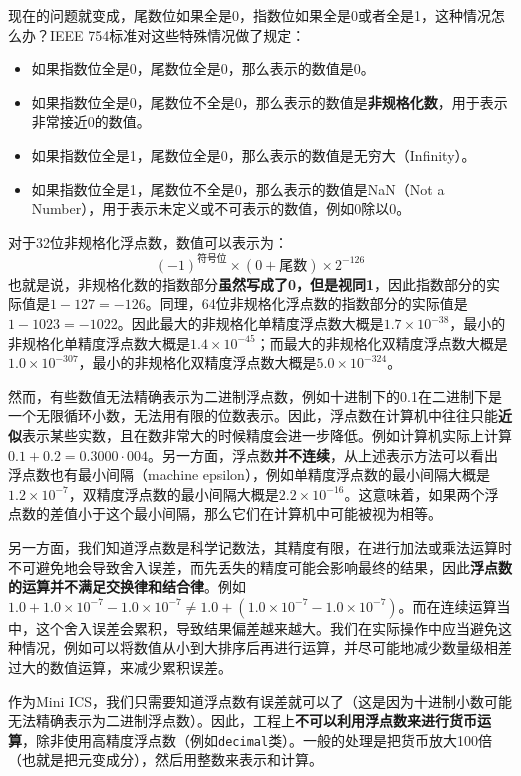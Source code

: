\documentclass[../main.tex]{subfiles}
\begin{document}
现在的问题就变成，尾数位如果全是0，指数位如果全是0或者全是1，这种情况怎么办？IEEE 754标准对这些特殊情况做了规定：
\begin{itemize}
  \item 如果指数位全是0，尾数位全是0，那么表示的数值是0。
  \item 如果指数位全是0，尾数位不全是0，那么表示的数值是\textbf{非规格化数}，用于表示非常接近0的数值。
  \item 如果指数位全是1，尾数位全是0，那么表示的数值是无穷大（Infinity）。
  \item 如果指数位全是1，尾数位不全是0，那么表示的数值是NaN（Not a Number），用于表示未定义或不可表示的数值，例如0除以0。
\end{itemize}
对于32位非规格化浮点数，数值可以表示为：
$$(-1)^{\text{符号位}} \times (0 + \text{尾数}) \times 2^{-126}$$
也就是说，非规格化数的指数部分\textbf{虽然写成了0，但是视同1}，因此指数部分的实际值是$1-127=-126$。同理，64位非规格化浮点数的指数部分的实际值是$1-1023=-1022$。因此最大的非规格化单精度浮点数大概是$1.7 \times 10^{-38}$，最小的非规格化单精度浮点数大概是$1.4 \times 10^{-45}$；而最大的非规格化双精度浮点数大概是$1.0 \times 10^{-307}$，最小的非规格化双精度浮点数大概是$5.0 \times 10^{-324}$。

然而，有些数值无法精确表示为二进制浮点数，例如十进制下的0.1在二进制下是一个无限循环小数，无法用有限的位数表示。因此，浮点数在计算机中往往只能\textbf{近似}表示某些实数，且在数非常大的时候精度会进一步降低。例如计算机实际上计算$0.1+0.2=0.3000\cdot004$。另一方面，浮点数\textbf{并不连续}，从上述表示方法可以看出浮点数也有最小间隔（machine epsilon），例如单精度浮点数的最小间隔大概是$1.2 \times 10^{-7}$，双精度浮点数的最小间隔大概是$2.2 \times 10^{-16}$。这意味着，如果两个浮点数的差值小于这个最小间隔，那么它们在计算机中可能被视为相等。

另一方面，我们知道浮点数是科学记数法，其精度有限，在进行加法或乘法运算时不可避免地会导致舍入误差，而先丢失的精度可能会影响最终的结果，因此\textbf{浮点数的运算并不满足交换律和结合律}。例如$1.0 + 1.0 \times 10^{-7} - 1.0 \times 10^{-7} \neq 1.0 + (1.0 \times 10^{-7} - 1.0 \times 10^{-7})$。而在连续运算当中，这个舍入误差会累积，导致结果偏差越来越大。我们在实际操作中应当避免这种情况，例如可以将数值从小到大排序后再进行运算，并尽可能地减少数量级相差过大的数值运算，来减少累积误差。

作为Mini ICS，我们只需要知道浮点数有误差就可以了（这是因为十进制小数可能无法精确表示为二进制浮点数）。因此，工程上\textbf{不可以利用浮点数来进行货币运算}，除非使用高精度浮点数（例如\texttt{decimal}类）。一般的处理是把货币放大100倍（也就是把元变成分），然后用整数来表示和计算。
\end{document}
